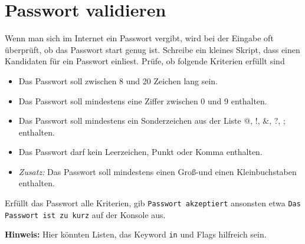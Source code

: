 \documentclass[a4paper]{article}
\begin{document}
\section{Passwort validieren}
Wenn man sich im Internet ein Passwort vergibt, wird bei der Eingabe oft überprüft, ob das Passwort start genug ist. Schreibe ein kleines Skript, dass einen Kandidaten für ein Passwort einliest. Prüfe, ob folgende Kriterien erfüllt sind
\begin{itemize}
	\item Das Passwort soll zwischen 8 und 20 Zeichen lang sein.
	\item Das Passwort soll mindestens eine Ziffer zwischen 0 und 9 enthalten.
	\item Das Passwort soll mindestens ein Sonderzeichen aus der Liste @, !, \&, ?,  ; enthalten. 
	\item Das Passwort darf kein Leerzeichen, Punkt oder Komma enthalten. 
	\item \emph{Zusatz:} Das Passwort soll mindestens einen Groß-und einen Kleinbuchstaben enthalten. 
\end{itemize}
Erfüllt das Passwort alle Kriterien, gib \texttt{Passwort akzeptiert} ansonsten etwa \texttt{Das Passwort ist zu kurz} auf der Konsole aus. 

\vspace{2pt}
{\footnotesize\textbf{Hinweis:}
Hier könnten Listen, das Keyword \texttt{in} und Flags hilfreich sein. }
\end{document}
